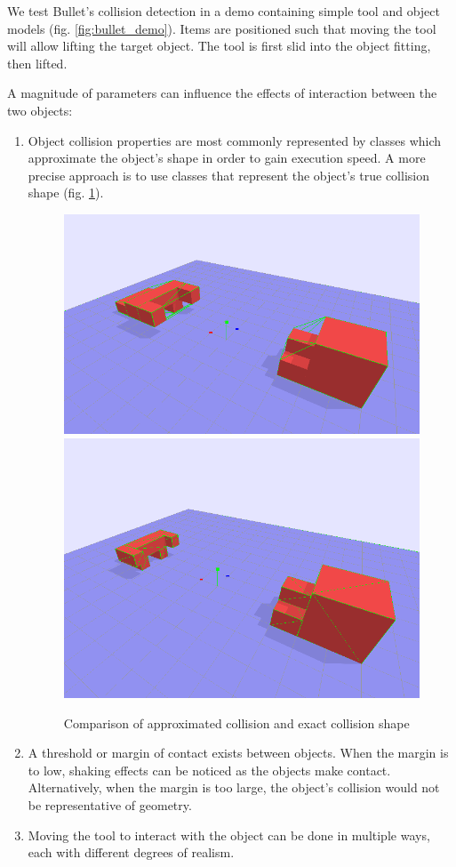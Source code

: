 \documentclass[11]{article}
\begin{document}
We test Bullet's collision detection in a demo containing simple tool and object models (fig. \ref{fig:bullet_demo}).
Items are positioned such that moving the tool will allow lifting the target object. 
The tool is first slid into the object fitting, then lifted. 

A magnitude of parameters can influence the effects of interaction between the two objects:
\begin{enumerate}
  \item Object collision properties are most commonly represented by classes which approximate the object's shape in order to gain execution speed.
    A more precise approach is to use classes that represent the object's true collision shape (fig. \ref{fig:collision_shape}).   

\begin{figure}[h]
  \centering
  \includegraphics[width=.48\textwidth]{./figures/collision_approximation.png}
  \includegraphics[width=.41\textwidth]{./figures/collision_exact.png}
  \caption{Comparison of approximated collision and exact collision shape}
  \label{fig:collision_shape}
\end{figure}      

  \item A threshold or margin of contact exists between objects. When the margin is to low, shaking effects can be noticed as the objects make contact. Alternatively, when the margin is too large, the object's collision would not be representative of geometry. 

  \item Moving the tool to interact with the object can be done in multiple ways, each with different degrees of realism.
\end{enumerate}
\end{document}
